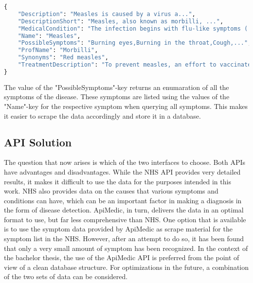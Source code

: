 \begin{lstlisting}[language=Python, caption={Response for the ApiMedic API (single issue)}]
{
	"Description": "Measles is caused by a virus a...",
	"DescriptionShort": "Measles, also known as morbilli, ...",
	"MedicalCondition": "The infection begins with flu-like symptoms ( ...",
	"Name": "Measles",
	"PossibleSymptoms": "Burning eyes,Burning in the throat,Cough,...",
	"ProfName": "Morbilli",
	"Synonyms": "Red measles",
	"TreatmentDescription": "To prevent measles, an effort to vaccinate ..."
}
\end{lstlisting}

The value of the "PossibleSymptoms"-key returns an enumaration of all the symptoms of the disease. These symptoms are listed using the values of the "Name"-key for the respective symptom when querying all symptoms. This makes it easier to scrape the data accordingly and store it in a database.

\subsection{API Solution}
The question that now arises is which of the two interfaces to choose. Both APIs have advantages and disadvantages. While the NHS API provides very detailed results, it makes it difficult to use the data for the purposes intended in this work. NHS also provides data on the causes that various symptoms and conditions can have, which can be an important factor in making a diagnosis in the form of disease detection. ApiMedic, in turn, delivers the data in an optimal format to use, but far less comprehensive than NHS. One option that is available is to use the symptom data provided by ApiMedic as scrape material for the symptom list in the NHS. However, after an attempt to do so, it has been found that only a very small amount of symptom has been recognized. In the context of the bachelor thesis, the use of the ApiMedic API is preferred from the point of view of a clean database structure. For optimizations in the future, a combination of the two sets of data can be considered.